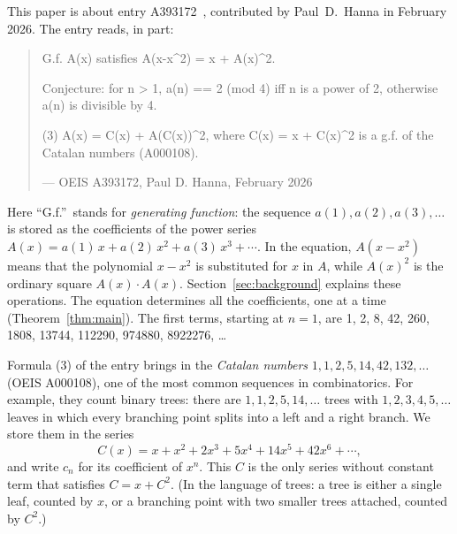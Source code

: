 \documentclass[11pt,a4paper]{article}
\theoremstyle{definition}
\theoremstyle{remark}
\begin{document}
This paper is about entry A393172~\cite{oeis}, contributed by Paul~D.~Hanna in February 2026. The entry reads, in part:
\begin{quote}\small\ttfamily\raggedright G.f. A(x) satisfies A(x-x\^{}2) = x + A(x)\^{}2.\par\smallskip Conjecture: for n > 1, a(n) == 2 (mod 4) iff n is a power of 2, otherwise a(n) is divisible by 4.\par\smallskip (3) A(x) = C(x) + A(C(x))\^{}2, where C(x) = x + C(x)\^{}2 is a g.f. of the Catalan numbers (A000108).\par\smallskip\hfill\textrm{--- OEIS A393172, Paul D. Hanna, February 2026}\end{quote}

Here ``G.f.''\ stands for \emph{generating function}: the sequence $a(1),a(2),a(3),\dots$ is stored as the coefficients
of the power series $A(x)=a(1)\,x+a(2)\,x^2+a(3)\,x^3+\cdots$. In the equation, $A(x-x^2)$ means that the polynomial
$x-x^2$ is substituted for $x$ in $A$, while $A(x)^2$ is the ordinary square $A(x)\cdot A(x)$. Section~\ref{sec:background}
explains these operations. The equation determines all the coefficients, one at a time (Theorem~\ref{thm:main}). The
first terms, starting at $n=1$, are 1, 2, 8, 42, 260, 1808, 13744, 112290, 974880, 8922276, \dots

Formula (3) of the entry brings in the \emph{Catalan numbers} $1,1,2,5,14,42,132,\dots$ (OEIS A000108), one of the most
common sequences in combinatorics. For example, they count binary trees: there are $1,1,2,5,14,\dots$ trees with
$1,2,3,4,5,\dots$ leaves in which every branching point splits into a left and a right branch. We store them in the
series
\[
C(x)=x+x^2+2x^3+5x^4+14x^5+42x^6+\cdots,
\]
and write $c_n$ for its coefficient of $x^n$. This $C$ is the only series without constant term that satisfies
$C=x+C^2$. (In the language of trees: a tree is either a single leaf, counted by $x$, or a branching point with two
smaller trees attached, counted by $C^2$.)
\end{document}
